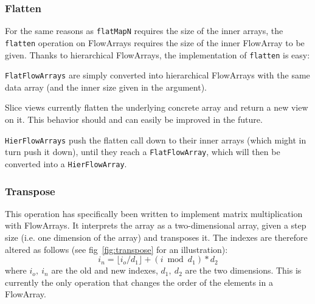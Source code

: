 \documentclass[runningheads,a4paper,fleqn]{llncs}
\begin{document}
\subsubsection{Flatten}
For the same reasons as \texttt{flatMapN} requires the size of the
inner arrays, the \texttt{flatten} operation on FlowArrays requires
the size of the inner FlowArray to be given. Thanks to hierarchical
FlowArrays, the implementation of \texttt{flatten} is easy:

\texttt{FlatFlowArrays} are simply converted into hierarchical
FlowArrays with the same data array (and the inner size given in the
argument).

Slice views currently flatten the underlying concrete array and return
a new view on it. This behavior should and can easily be improved in
the future.

\texttt{HierFlowArrays} push the flatten call down to their inner
arrays (which might in turn push it down), until they reach a
\texttt{FlatFlowArray}, which will then be converted into a
\texttt{HierFlowArray}.

\subsubsection{Transpose}
This operation has specifically been written to implement matrix
multiplication with FlowArrays. It interprets the array as a
two-dimensional array, given a step size (i.e. one dimension of the
array) and transposes it. The indexes are therefore altered as
follows (see fig~\ref{fig:transpose} for an illustration):
\[ i_n = \lfloor i_o / d_1 \rfloor + (i \bmod d_1) * d_2 \]
where $i_o,\ i_n$ are the old and new indexes, $d_1,\ d_2$ are the two
dimensions. This is currently the only operation that changes the
order of the elements in a FlowArray.
\end{document}
